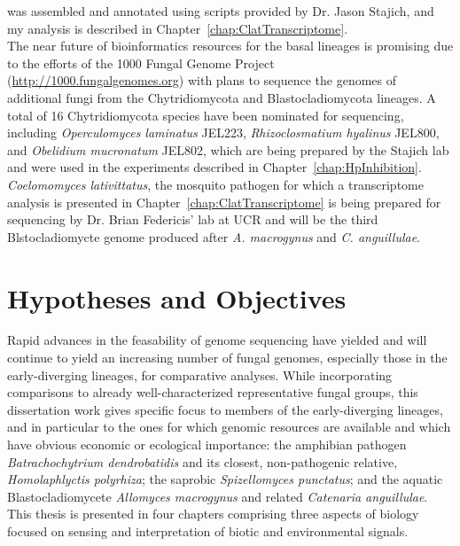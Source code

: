 was assembled and annotated using scripts provided by Dr. Jason
Stajich, and my analysis is described in
Chapter~\ref{chap:ClatTranscriptome}.\\
\indent The near future of bioinformatics resources for the basal
lineages is promising due to the efforts of the 1000 Fungal Genome
Project (\url{http://1000.fungalgenomes.org}) with plans to sequence the 
genomes of additional fungi from the Chytridiomycota and Blastocladiomycota 
lineages. A total of 16 Chytridiomycota species have been nominated for 
sequencing, including \textit{Operculomyces laminatus} JEL223, 
\textit{Rhizoclosmatium hyalinus} JEL800, and \textit{Obelidium mucronatum} JEL802, 
which are being prepared by the Stajich lab and were used in the experiments 
described in Chapter~\ref{chap:HpInhibition}. \textit{Coelomomyces lativittatus}, 
the mosquito pathogen for which a transcriptome analysis is presented in 
Chapter~\ref{chap:ClatTranscriptome} is being prepared for sequencing by 
Dr. Brian Federicis' lab at UCR and will be the third Blstocladiomycte genome
produced after \textit{A. macrogynus} and \textit{C. anguillulae}.\\

\section{Hypotheses and Objectives}
\indent Rapid advances in the feasability of genome sequencing have
yielded and will continue to yield an increasing number of fungal
genomes, especially those in the early-diverging lineages, for
comparative analyses. While incorporating comparisons to already
well-characterized representative fungal groups, this dissertation
work gives specific focus to members of the early-diverging lineages,
and in particular to the ones for which genomic resources are
available and which have obvious economic or ecological importance:
the amphibian pathogen \textit{Batrachochytrium dendrobatidis} and its
closest, non-pathogenic relative, \textit{Homolaphlyctis polyrhiza};
the saprobic \textit{Spizellomyces punctatus}; and the aquatic
Blastocladiomycete \textit{Allomyces macrogynus} and related
\textit{Catenaria anguillulae}. This thesis is presented in four
chapters comprising three aspects of biology focused on sensing and
interpretation of biotic and environmental signals.\\
